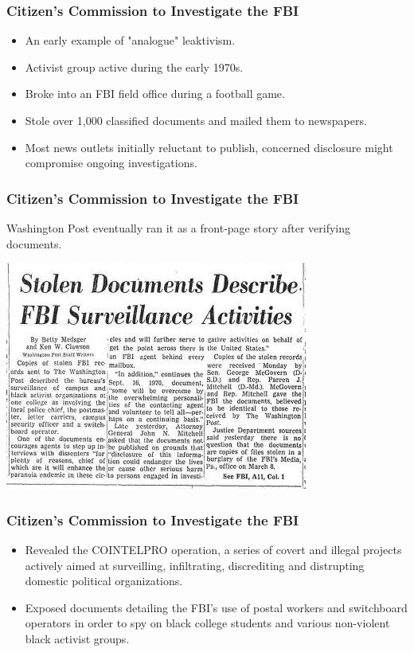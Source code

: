 \documentclass[aspectratio=169,usenames,dvipsnames]{beamer}
\begin{document}
\begin{frame}
  \frametitle{Citizen's Commission to Investigate the FBI}

  \begin{itemize}[<+->]
    \item An early example of "analogue" leaktivism.
    \item Activist group active during the early 1970s.
    \item Broke into an FBI field office during a football game.
    \item Stole over 1,000 classified documents and mailed them to newspapers.
    \item Most news outlets initially reluctant to publish, concerned
      disclosure might compromise ongoing investigations.
  \end{itemize}

\end{frame}

\begin{frame}[c]
  \frametitle{Citizen's Commission to Investigate the FBI}
  Washington Post eventually ran it as a front-page story after verifying
  documents.

  \vspace{1cm}
  \centering

  \includegraphics[width=\textwidth,height=0.4\textheight,keepaspectratio]{img/citizens_commission.jpg}
\end{frame}

\begin{frame}[c]
  \frametitle{Citizen's Commission to Investigate the FBI}

  \begin{itemize}[<+->]
    \item Revealed the COINTELPRO operation, a series of covert and illegal
      projects actively aimed at surveilling, infiltrating, discrediting and
      distrupting domestic political organizations.
    \item Exposed documents detailing the FBI's use of postal workers and
      switchboard operators in order to spy on black college students and
      various non-violent black activist groups.
  \end{itemize}
\end{frame}
\end{document}
